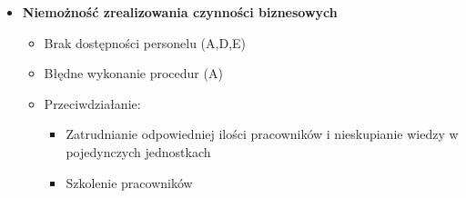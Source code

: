 \begin{itemize}
\begin{itemize}
\begin{itemize}
		\end{itemize}
	\end{itemize}
	\item \textbf{Niemożność zrealizowania czynności biznesowych}
	\begin{itemize}
		\item Brak dostępności personelu (A,D,E)
		\item Błędne wykonanie procedur (A)
		\item Przeciwdziałanie:
		\begin{itemize}
			\item Zatrudnianie odpowiedniej ilości pracowników i nieskupianie wiedzy w pojedynczych jednostkach
			\item Szkolenie pracowników
		\end{itemize}
	\end{itemize}
\end{itemize}
